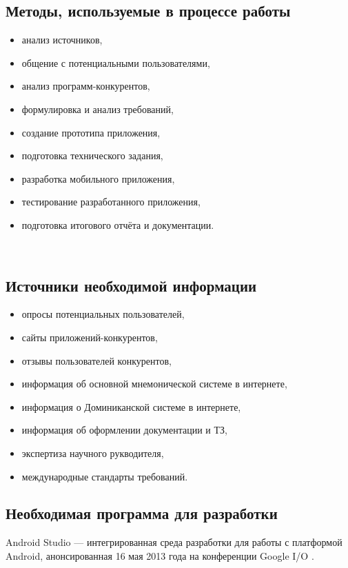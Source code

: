 \documentclass[draft]{article}
\begin{document}
\subsection{Методы, используемые в процессе работы}
\begin{itemize}
\item анализ источников,
\item общение с потенциальными пользователями,
\item анализ программ-конкурентов,
\item формулировка и анализ требований,
\item создание прототипа приложения,
\item подготовка технического задания,
\item разработка мобильного приложения,
\item тестирование разработанного приложения,
\item подготовка итогового отчёта и документации.
\end{itemize}
~\\
\subsection{Источники необходимой информации}
\begin{itemize}
\item опросы потенциальных пользователей,
\item сайты приложений-конкурентов,
\item отзывы пользователей конкурентов,
\item информация об основной мнемонической системе в интернете,
\item информация о Доминиканской системе в интернете,
\item информация об оформлении документации и ТЗ,
\item экспертиза научного рукводителя,
\item международные стандарты требований.
\end{itemize}
\subsection{Необходимая программа для разработки}
Android Studio — интегрированная среда разработки для работы с платформой Android, анонсированная 16 мая 2013 года на конференции Google I/O \cite{litlink1}.\\
~\\
\end{document}

